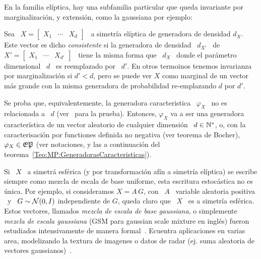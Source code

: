 En la familia el\'iptica, hay una subfamilia particular que queda invariante por
marginalizaci\'on, y extensi\'on, como la gaussiana por ejemplo:
%
\begin{definicion}
%
  Sea \  $X = \begin{bmatrix} X_1 &  \cdots & X_d \end{bmatrix}$  \ a simetr\'ia
  el\'iptica  de  generadora de  densidad  $d_X$.   Este  vector es  dicho  {\em
    consistente}   si  la   generadora  de   densidad  \   $d_{X'}$  \   de  $X'
  = \begin{bmatrix} X_1 & \cdots &  X_{d'} \end{bmatrix}$ \ tiene la misma forma
  que \ $d_X$  \ donde el par\'ametro  dimensional \ $d$ \ es  reemplazado por \
  $d'$.  En  otros termoinos tenemos  invarianza por marginalizaci\'on si  $d' <
  d$, pero se puede ver $X$ como marginal de un vector m\'as grande con la misma
  generadora de probabilidad re-emplazando $d$ por $d'$.

  Se proba  que, equivalentemente, la generadora caracteristica  \ $\varphi_X$ \
  no  es  relacionada a  \  $d$  (ver~\cite{Kan94,  FanKot90} para  la  prueba).
  Entonces, $\varphi_X$  va a ser  una generadora caracter\'istica de  un vector
  aleatorio   de  cualquier   dimensi\'on  \   $d  \in   \mathbb{N}^*$,  o,   con  la
  caracterisaci\'on por functiones definida no negativa (ver teorema de Bocher),
  \  $\varphi_X  \in  \mathfrak{EP}$  (ver   notaciones,  y  las  a  continuaci\'on  del
  teorema~\ref{Teo:MP:GeneradorasCaracteristicas}).
\end{definicion}


Si \  $X$ \ a simetr\'a  esf\'erica (y por transformaci\'on  af\'in a simetr\'ia
el\'iptica)  se escribe siempre  como mezcla  de escala  de base  uniforme, esta
escritura estoc\'astica  no es \'unica. Por  ejemplo, si consideramos $X  = A \,
G$, con \ $A$ \ variable aleatoria positiva \ y \ $G \sim \mathcal{N}(0,I)$ independiente
de $G$,  queda claro  que \ $X$  \ es  a simetr\'ia esf\'erica.  Estos vectores,
llamados {\em mezcla de escala de  base gaussiana}, o simplemente {\em mezcla de
  escala  gaussiana}  (GSM  para  gaussian  scale mixture  en  ingl\'es)  fueron
estudiados  intensivamente de  manera formal~\cite{Kan94,  Yao73,  Ver64, Pic70,
  Kel71,  Kin72, KeiSte74,  Tei60, AndMal74}.   Ecuentra aplicaciones  en varias
area, modelizando la  textura de imagenes o datos de  radar (ej.  suma aleatoria
de  vectores gaussianos)~\cite{PorStr03,  BomBea08,  Sel08, ShiSel07,  ZozVig10,
  TisNic04, TodTab07}.


